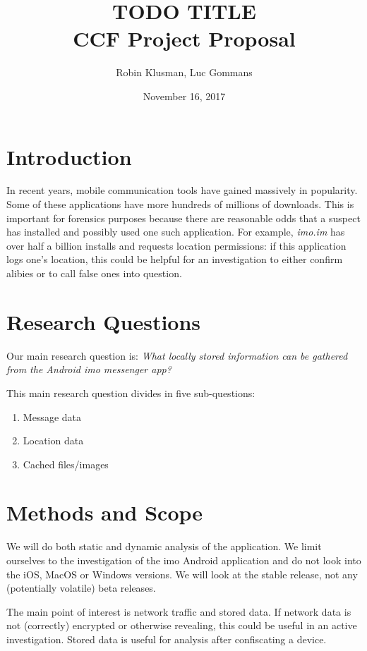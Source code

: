 \documentclass{article}
\title{TODO TITLE \\
	\vspace{0.3cm}
	{\large CCF Project Proposal}
}
\date{November 16, 2017}
\author{Robin Klusman, Luc Gommans}
\begin{document}
\maketitle

\section{Introduction}

In recent years, mobile communication tools have gained massively in
popularity. Some of these applications have more hundreds of millions of
downloads. This is important for forensics purposes because there are
reasonable odds that a suspect has installed and possibly used one such
application. For example, {\it imo.im} has over half a billion installs and
requests location permissions: if this application logs one's location, this
could be helpful for an investigation to either confirm alibies or to call
false ones into question.


\section{Research Questions}

Our main research question is:
{\it What locally stored information can be gathered from the Android imo messenger app?}

\vspace{0.5cm}

This main research question divides in five sub-questions:

\begin{enumerate}
	\item Message data
	\item Location data
	\item Cached files/images
\end{enumerate}


\section{Methods and Scope}

We will do both static and dynamic analysis of the application. We limit
ourselves to the investigation of the imo Android application and do not look
into the iOS, MacOS or Windows versions. We will look at the stable release,
not any (potentially volatile) beta releases.

The main point of interest is network traffic and stored data. If network data
is not (correctly) encrypted or otherwise revealing, this could be useful in an
active investigation. Stored data is useful for analysis after confiscating a
device.
\end{document}
